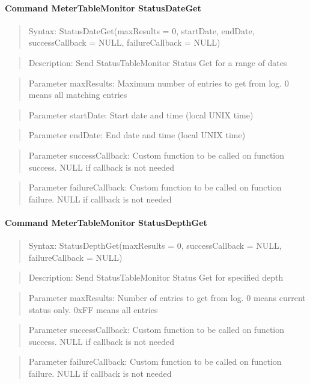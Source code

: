\paragraph{Command MeterTableMonitor StatusDateGet}
\begin{quote}Syntax: StatusDateGet(maxResults = 0, startDate, endDate, successCallback = NULL, failureCallback = NULL)\end{quote}
\begin{quote}Description: Send StatusTableMonitor Status Get for a range of dates\end{quote}
\begin{quote}Parameter maxResults: Maximum number of entries to get from log. 0 means all matching entries\end{quote}
\begin{quote}Parameter startDate: Start date and time (local UNIX time)\end{quote}
\begin{quote}Parameter endDate: End date and time (local UNIX time)\end{quote}
\begin{quote}Parameter successCallback: Custom function to be called on function success. NULL if callback is not needed\end{quote}
\begin{quote}Parameter failureCallback: Custom function to be called on function failure. NULL if callback is not needed\end{quote}


\paragraph{Command MeterTableMonitor StatusDepthGet}
\begin{quote}Syntax: StatusDepthGet(maxResults = 0, successCallback = NULL, failureCallback = NULL)\end{quote}
\begin{quote}Description: Send StatusTableMonitor Status Get for specified depth\end{quote}
\begin{quote}Parameter maxResults: Number of entries to get from log. 0 means current status only. 0xFF means all entries\end{quote}
\begin{quote}Parameter successCallback: Custom function to be called on function success. NULL if callback is not needed\end{quote}
\begin{quote}Parameter failureCallback: Custom function to be called on function failure. NULL if callback is not needed\end{quote}


